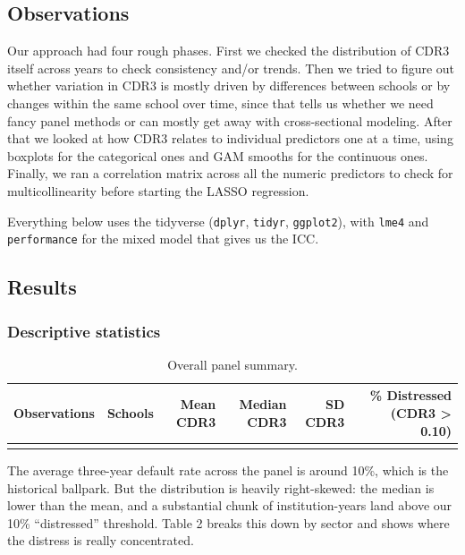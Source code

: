 \documentclass[
]{article}
\begin{document}
\subsection{Observations}\label{observations}

Our approach had four rough phases. First we checked the distribution of
CDR3 itself across years to check consistency and/or trends. Then we
tried to figure out whether variation in CDR3 is mostly driven by
differences between schools or by changes within the same school over
time, since that tells us whether we need fancy panel methods or can
mostly get away with cross-sectional modeling. After that we looked at
how CDR3 relates to individual predictors one at a time, using boxplots
for the categorical ones and GAM smooths for the continuous ones.
Finally, we ran a correlation matrix across all the numeric predictors
to check for multicollinearity before starting the LASSO regression.

Everything below uses the tidyverse (\texttt{dplyr}, \texttt{tidyr},
\texttt{ggplot2}), with \texttt{lme4} and \texttt{performance} for the
mixed model that gives us the ICC.

\subsection{Results}\label{results}

\subsubsection{Descriptive statistics}\label{descriptive-statistics}

\begingroup\fontsize{9}{11}\selectfont

\begin{longtable}[t]{rrrrrr}
\caption{\label{tab:descriptives}Overall panel summary.}\\
\toprule
Observations & Schools & Mean CDR3 & Median CDR3 & SD CDR3 & \% Distressed (CDR3 > 0.10)\\
\midrule
\cellcolor{gray!10}{31782} & \cellcolor{gray!10}{3780} & \cellcolor{gray!10}{0.107} & \cellcolor{gray!10}{0.093} & \cellcolor{gray!10}{0.079} & \cellcolor{gray!10}{46.7}\\
\bottomrule
\end{longtable}
\endgroup{}

The average three-year default rate across the panel is around 10\%,
which is the historical ballpark. But the distribution is heavily
right-skewed: the median is lower than the mean, and a substantial chunk
of institution-years land above our 10\% ``distressed'' threshold. Table
2 breaks this down by sector and shows where the distress is really
concentrated.
\end{document}
